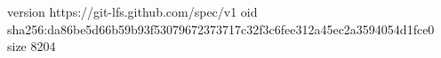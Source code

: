version https://git-lfs.github.com/spec/v1
oid sha256:da86be5d66b59b93f53079672373717c32f3c6fee312a45ec2a3594054d1fce0
size 8204
